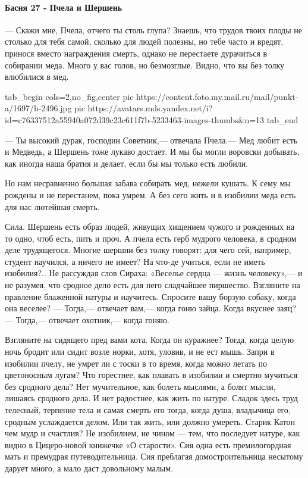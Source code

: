  
 
 
 
 

\paragraph{Басня 27 - Пчела и Шершень}

— Скажи мне, Пчела, отчего ты столь глупа? Знаешь, что трудов твоих плоды не
столько для тебя самой, сколько для людей полезны, но тебе часто и вредят,
принося вместо награждения смерть, однако не перестаете дурачиться в собирании
меда. Много у вас голов, но безмозглые. Видно, что вы без толку влюбилися в
мед.

\ifcmt
  tab_begin cols=2,no_fig,center
     pic https://content.foto.my.mail.ru/mail/punkt-a/1697/h-2496.jpg
		 pic https://avatars.mds.yandex.net/i?id=c76337512a55940a072d39c23c611f7b-5233463-images-thumbs&n=13 
  tab_end
\fi

— Ты высокий дурак, господин Советник,— отвечала Пчела.— Мед любит есть и
Медведь, а Шершень тоже лукаво достает. И мы бы могли воровски добывать, как
иногда наша братия и делает, если бы мы только есть любили.

Но нам несравненно большая забава собирать мед, нежели кушать. К сему мы
рождены и не перестанем, пока умрем. А без сего жить и в изобилии меда есть для
нас лютейшая смерть.

Сила. Шершень есть образ людей, живущих хищением чужого и рожденных на то одно,
чтоб есть, пить и проч. А пчела есть герб мудрого человека, в сродном деле
трудящегося. Многие шершни без толку говорят: для чего сей, например, студент
научился, а ничего не имеет? На что-де учиться, если не иметь изобилия?.. Не
рассуждая слов Сираха: «Веселье сердца — жизнь человеку»,— и не разумея, что
сродное дело есть для него сладчайшее пиршество. Взгляните на правление
блаженной натуры и научитесь. Спросите вашу борзую собаку, когда она веселее? —
Тогда,— отвечает вам,— когда гоню зайца. Когда вкуснее заяц? — Тогда,— отвечает
охотник,— когда гоняю.

Взгляните на сидящего пред вами кота. Когда он куражнее? Тогда, когда целую
ночь бродит или сидит возле норки, хотя, уловив, и не ест мышь. Запри в
изобилии пчелу, не умрет ли с тоски в то время, когда можно летать по
цветоносным лугам? Что горестнее, как плавать в изобилии и смертно мучиться без
сродного дела? Нет мучительное, как болеть мыслями, а болят мысли, лишаясь
сродного дела. И нет радостнее, как жить по натуре. Сладок здесь труд телесный,
терпение тела и самая смерть его тогда, когда душа, владычица его, сродным
услаждается делом. Или так жить, или должно умереть. Старик Катон чем мудр и
счастлив? Не изобилием, не чином — тем, что последует натуре, как видно в
Цицеро-новой книжечке «О старости». Сия одна есть премилогордная мать и
премудрая путеводительница. Сия преблагая домостроительница несытому дарует
много, а мало даст довольному малым.

